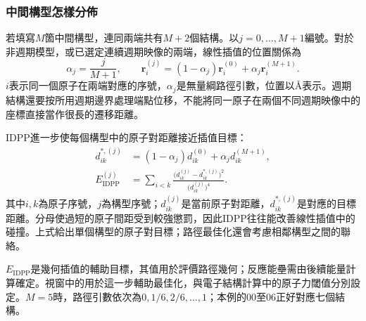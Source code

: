 \subsubsection{中間構型怎樣分佈}

若填寫$M$箇中間構型，連同兩端共有$M+2$個結構。以$j=0,\ldots,M+1$編號。對於非週期模型，或已選定連續週期映像的兩端，線性插值的位置關係為
\begin{equation}
  \alpha_j=\frac{j}{M+1},\qquad
  \mathbf r_i^{(j)}=(1-\alpha_j)\mathbf r_i^{(0)}
     +\alpha_j\mathbf r_i^{(M+1)}.
  \label{eq:neb-image-interpolation}
\end{equation}
$i$表示同一個原子在兩端對應的序號，$\alpha_j$是無量綱路徑引數，位置以\AA 表示。週期結構還要按所用週期邊界處理端點位移，不能將同一原子在兩個不同週期映像中的座標直接當作很長的遷移距離。

IDPP進一步使每個構型中的原子對距離接近插值目標：
\begin{equation}
\begin{aligned}
  d_{ik}^{*,(j)}&=(1-\alpha_j)d_{ik}^{(0)}
                      +\alpha_j d_{ik}^{(M+1)},\\
  E_{\mathrm{IDPP}}^{(j)}&=
    \sum_{i<k}\frac{\bigl(d_{ik}^{(j)}-d_{ik}^{*,(j)}\bigr)^2}
                         {\bigl(d_{ik}^{(j)}\bigr)^4}.
\end{aligned}
\label{eq:idpp-pair-objective}
\end{equation}
其中$i,k$為原子序號，$j$為構型序號；$d_{ik}^{(j)}$是當前原子對距離，$d_{ik}^{*,(j)}$是對應的目標距離。分母使過短的原子間距受到較強懲罰，因此IDPP往往能改善線性插值中的碰撞。上式給出單個構型的原子對目標；路徑最佳化還會考慮相鄰構型之間的聯絡。

$E_{\mathrm{IDPP}}$是幾何插值的輔助目標，其值用於評價路徑幾何；反應能壘需由後續能量計算確定。視窗中的用於這一步輔助最佳化，與電子結構計算中的原子力閾值分別設定。$M=5$時，路徑引數依次為$0,1/6,2/6,\ldots,1$；本例的00至06正好對應七個結構。
